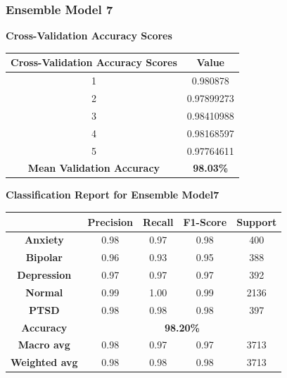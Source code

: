 \subsubsection{Ensemble Model 7}

\begin{center}
    \textbf{Cross-Validation Accuracy Scores} \\[0.5em]
    \begin{tabular}{|c|c|}
        \hline
        \textbf{Cross-Validation Accuracy Scores} & \textbf{Value} \\ \hline
        1 & 0.980878 \\ \hline
        2 & 0.97899273 \\ \hline
        3 & 0.98410988 \\ \hline
        4 & 0.98168597 \\ \hline
        5 & 0.97764611 \\ \hline
        \textbf{Mean Validation Accuracy} & \textbf{98.03\%} \\ \hline
    \end{tabular}
\end{center}

\begin{center}
    \textbf{Classification Report for Ensemble Model7} \\[0.5em]
    \begin{tabular}{|c|c|c|c|c|}
        \hline
        & \textbf{Precision} & \textbf{Recall} & \textbf{F1-Score} & \textbf{Support} \\ \hline
        \textbf{Anxiety}    & 0.98 & 0.97 & 0.98 & 400 \\ \hline
        \textbf{Bipolar}    & 0.96 & 0.93 & 0.95 & 388 \\ \hline
        \textbf{Depression} & 0.97 & 0.97 & 0.97 & 392 \\ \hline
        \textbf{Normal}     & 0.99 & 1.00 & 0.99 & 2136 \\ \hline
        \textbf{PTSD}       & 0.98 & 0.98 & 0.98 & 397 \\ \hline
        \textbf{Accuracy}   & \multicolumn{4}{c|}{\textbf{98.20\%}} \\ \hline
        \textbf{Macro avg}  & 0.98 & 0.97 & 0.97 & 3713 \\ \hline
        \textbf{Weighted avg} & 0.98 & 0.98 & 0.98 & 3713 \\ \hline
    \end{tabular}
\end{center}


